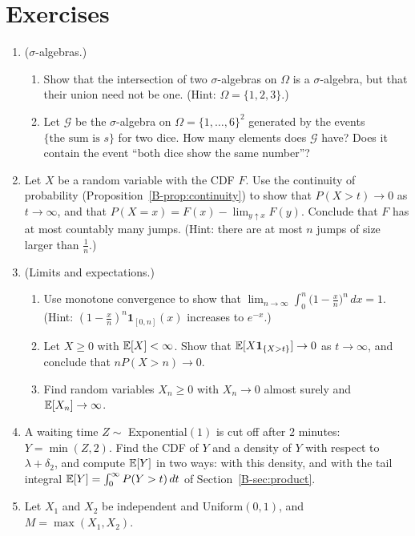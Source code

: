 \section*{Exercises}
\begin{enumerate}[leftmargin=*]
    \item ($\sigma$-algebras.)
    \begin{enumerate}[label=(\alph*)]
        \item Show that the intersection of two $\sigma$-algebras on $\Omega$ is a $\sigma$-algebra, but that their union need not be one. (Hint: $\Omega = \{1, 2, 3\}$.)
        \item Let $\mathcal{G}$ be the $\sigma$-algebra on $\Omega = \{1, \ldots, 6\}^2$ generated by the events $\{\text{the sum is } s\}$ for two dice. How many elements does $\mathcal{G}$ have? Does it contain the event ``both dice show the same number''?
    \end{enumerate}
    \item Let $X$ be a random variable with the CDF $F$. Use the continuity of probability (Proposition~\ref{B-prop:continuity}) to show that $P(X > t) \to 0$ as $t \to \infty$, and that $P(X = x) = F(x) - \lim_{y \uparrow x} F(y)$. Conclude that $F$ has at most countably many jumps. (Hint: there are at most $n$ jumps of size larger than $\frac{1}{n}$.)
    \item (Limits and expectations.)
    \begin{enumerate}[label=(\alph*)]
        \item Use monotone convergence to show that $\lim_{n \to \infty}\int_0^n \big(1 - \frac{x}{n}\big)^n\, dx = 1$. (Hint: $(1 - \frac{x}{n})^n\mathbf{1}_{[0, n]}(x)$ increases to $e^{-x}$.)
        \item Let $X \geq 0$ with $\mathbb{E}[X] < \infty$. Show that $\mathbb{E}[X\mathbf{1}_{\{X > t\}}] \to 0$ as $t \to \infty$, and conclude that $nP(X > n) \to 0$.
        \item Find random variables $X_n \geq 0$ with $X_n \to 0$ almost surely and $\mathbb{E}[X_n] \to \infty$.
    \end{enumerate}
    \item A waiting time $Z \sim$ Exponential$(1)$ is cut off after $2$ minutes: $Y = \min(Z, 2)$. Find the CDF of $Y$ and a density of $Y$ with respect to $\lambda + \delta_2$, and compute $\mathbb{E}[Y]$ in two ways: with this density, and with the tail integral $\mathbb{E}[Y] = \int_0^\infty P(Y > t)\, dt$ of Section~\ref{B-sec:product}.
    \item Let $X_1$ and $X_2$ be independent and Uniform$(0, 1)$, and $M = \max(X_1, X_2)$.

\end{enumerate}
